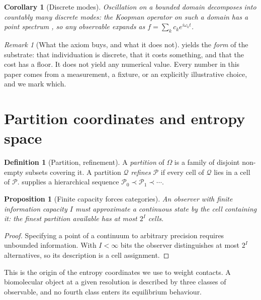 \documentclass[11pt,twocolumn,a4paper]{article}
\theoremstyle{thmstyle}
\newtheorem{proposition}[theorem]{Proposition}
\newtheorem{corollary}[theorem]{Corollary}
\theoremstyle{definition}
\newtheorem{definition}[theorem]{Definition}
\theoremstyle{remark}
\newtheorem{remark}[theorem]{Remark}
\begin{document}
\begin{corollary}[Discrete modes]
\label{cor:modes}
Oscillation on a bounded domain decomposes into countably many discrete modes:
the Koopman operator on such a domain has a point spectrum
\citep{koopman1931}, so any observable expands as
$f=\sum_k c_k e^{i\omega_k t}$.
\end{corollary}

\begin{remark}[What the axiom buys, and what it does not]
\label{rem:axiom-honest}
 yields the \emph{form} of the substrate: that individuation
is discrete, that it costs something, and that the cost has a floor. It does
not yield any numerical value. Every number in this paper comes from a
measurement, a fixture, or an explicitly illustrative choice, and we mark
which.
\end{remark}

\section{Partition coordinates and entropy space}
\label{sec:partition}

\begin{definition}[Partition, refinement]
\label{def:partition}
A \emph{partition} of $\Omega$ is a family of disjoint non-empty subsets
covering it. A partition $\mathcal{Q}$ \emph{refines} $\mathcal{P}$ if every
cell of $\mathcal{Q}$ lies in a cell of $\mathcal{P}$. 
supplies a hierarchical sequence $\mathcal{P}_0 \prec \mathcal{P}_1 \prec
\cdots$.
\end{definition}

\begin{proposition}[Finite capacity forces categories]
\label{prop:categorical}
An observer with finite information capacity $I$ must approximate a continuous
state by the cell containing it: the finest partition available has at most
$2^I$ cells.
\end{proposition}

\begin{proof}
Specifying a point of a continuum to arbitrary precision requires unbounded
information. With $I<\infty$ bits the observer distinguishes at most $2^I$
alternatives, so its description is a cell assignment.
\end{proof}

This is the origin of the entropy coordinates we use to weight contacts. A
biomolecular object at a given resolution is described by three classes of
observable, and no fourth class enters its equilibrium behaviour.
\end{document}

